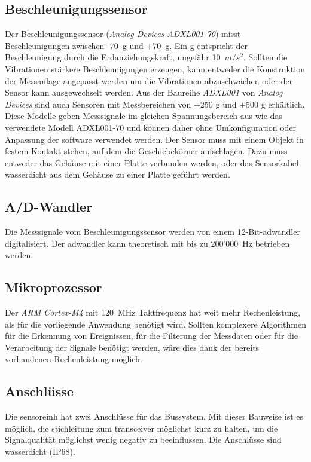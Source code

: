 \subsection{Beschleunigungssensor}
Der Beschleunigungssensor (\emph{Analog Devices ADXL001-70}) misst Beschleunigungen zwischen -70~g und +70~g. Ein g entspricht der Beschleunigung durch die Erdanziehungskraft, ungefähr 10~\ensuremath{m/s^2}. Sollten die Vibrationen stärkere Beschleunigungen erzeugen, kann entweder die Konstruktion der Messanlage angepasst werden um die Vibrationen abzuschwächen oder der Sensor kann ausgewechselt werden. Aus der Baureihe \emph{ADXL001} von \emph{Analog Devices} sind auch Sensoren mit Messbereichen von \ensuremath{\pm}250 g und \ensuremath{\pm}500 g erhältlich. Diese Modelle geben Messsignale im gleichen Spannungsbereich aus wie das verwendete Modell ADXL001-70 und können daher ohne Umkonfiguration oder Anpassung der \gls{software} verwendet werden.
Der Sensor muss mit einem Objekt in festem Kontakt stehen, auf dem die Geschiebekörner aufschlagen. Dazu muss entweder das Gehäuse mit einer Platte verbunden werden, oder das Sensorkabel wasserdicht aus dem Gehäuse zu einer Platte geführt werden.

\subsection{A/D-Wandler}
Die Messsignale vom Beschleunigungssensor werden von einem 12-Bit-\gls{adwandler} digitalisiert. Der \gls{adwandler} kann theoretisch mit bis zu 200'000~Hz betrieben werden.


\subsection{Mikroprozessor}
Der \emph{ARM Cortex-M4} mit 120~MHz Taktfrequenz hat weit mehr Rechenleistung, als für die vorliegende Anwendung benötigt wird. Sollten komplexere Algorithmen für die Erkennung von Ereignissen, für die Filterung der Messdaten oder für die Verarbeitung der Signale benötigt werden, wäre dies dank der bereits vorhandenen Rechenleistung möglich.

\subsection{Anschlüsse}
Die \gls{sensoreinh} hat zwei Anschlüsse für das Bussystem. Mit dieser Bauweise ist es möglich, die \gls{stichleitung} zum \gls{transceiver} möglichst kurz zu halten, um die Signalqualität möglichst wenig negativ zu beeinflussen. Die Anschlüsse sind wasserdicht (IP68).














